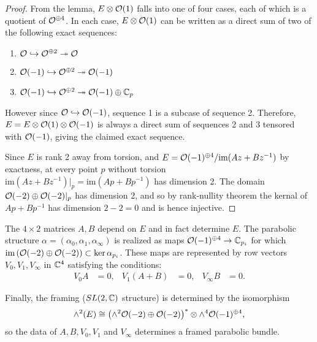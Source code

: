 	\begin{proof}
		From the lemma, $E\otimes \mathcal{O}(1)$ falls into one of four cases, each of which is a quotient of $\mathcal{O}^{\oplus 4}$. In each case, $E\otimes \mathcal{O}(1)$ can be written as a direct sum of two of the following exact sequences:
		\begin{enumerate}
			\item $\mathcal{O} \hookrightarrow \mathcal{O}^{\oplus 2} \twoheadrightarrow \mathcal{O}$
			\item $\mathcal{O}(-1) \hookrightarrow \mathcal{O}^{\oplus 2}\twoheadrightarrow \mathcal{O}(-1) $
			\item $\mathcal{O}(-1)\hookrightarrow \mathcal{O}^{\oplus 2}\twoheadrightarrow \mathcal{O}(-1)\oplus \mathbb{C}_p$
		\end{enumerate}
		However since $\mathcal{O} \hookrightarrow \mathcal{O}(-1)$, sequence 1 is a subcase of sequence 2. Therefore, $E = E\otimes \mathcal{O}(1)\otimes \mathcal{O}(-1)$ is always a direct sum of sequences 2 and 3 tensored with $\mathcal{O}(-1)$, giving the claimed exact sequence.
		
		Since $E$ is rank 2 away from torsion, and $E = \mathcal{O}(-1)^{\oplus 4}/\text{im}(Az+Bz^{-1})$ by exactness, at every point $p$ without torsion $\text{im}(Az+Bz^{-1})|_p = \text{im}(Ap+Bp^{-1})$ has dimension 2. The domain $\mathcal{O}(-2)\oplus\mathcal{O}(-2)|_p$ has dimension 2, and so by rank-nullity theorem the kernal of $Ap+Bp^{-1}$ has dimension $2-2=0$ and is hence injective. 
	\end{proof}
	The $4\times2$ matrices $A,B$ depend on $E$ and in fact determine $E$. The parabolic structure $\alpha = (\alpha_0,\alpha_1,\alpha_\infty)$ is realized as maps $\mathcal{O}(-1)^{\oplus 4}\to \mathbb{C}_{p_i}$ for which $\text{im}\left(\mathcal{O}(-2)\oplus\mathcal{O}(-2)\right) \subset \ker\alpha_{p_i}$. These maps are represented by row vectors $V_0,V_1,V_\infty$ in $\mathbb{C}^4$ satisfying the conditions:
	\begin{align}
		\label{e:p3-conds}
		V_0 A &=0, & V_1(A+B) &= 0, & V_\infty B &=0.
	\end{align}
	
	Finally, the framing ($SL(2,\mathbb{C})$ structure) is determined by the isomorphism
	\begin{equation}
		\wedge^2 (E) \cong \left(\wedge^2 \mathcal{O}(-2)\oplus \mathcal{O}(-2)\right)^\ast\otimes \wedge^4\mathcal{O}(-1)^{\oplus 4},
	\end{equation}
	so the data of $A,B, V_0,V_1$ and $V_\infty$ determines a framed parabolic bundle.
	

